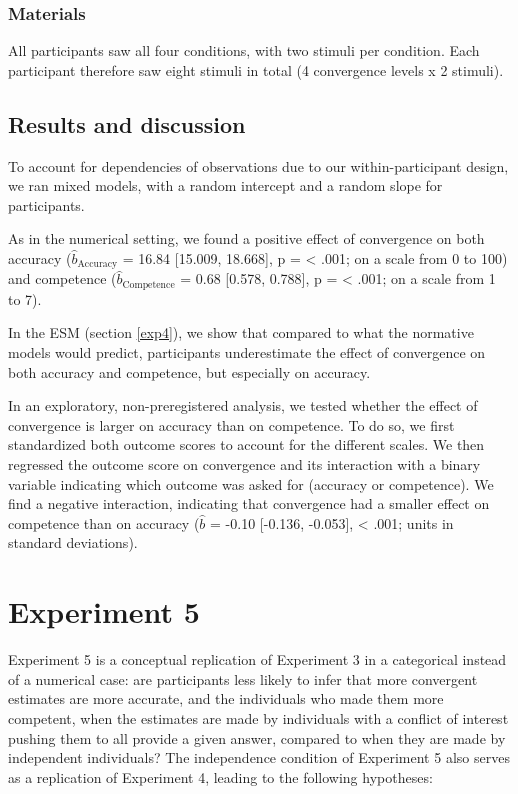 \documentclass[
  doc,floatsintext]{apa6}
\begin{document}
\subsubsection{Materials}\label{materials-3}

All participants saw all four conditions, with two stimuli per condition. Each participant therefore saw eight stimuli in total (4 convergence levels x 2 stimuli).

\subsection{Results and discussion}\label{results-and-discussion-3}

To account for dependencies of observations due to our within-participant design, we ran mixed models, with a random intercept and a random slope for participants.

As in the numerical setting, we found a positive effect of convergence on both accuracy (\(\hat{b}_{\text{Accuracy}}\) = 16.84 {[}15.009, 18.668{]}, p = \textless{} .001; on a scale from 0 to 100) and competence (\(\hat{b}_{\text{Competence}}\) = 0.68 {[}0.578, 0.788{]}, p = \textless{} .001; on a scale from 1 to 7).

In the ESM (section \ref{exp4}), we show that compared to what the normative models would predict, participants underestimate the effect of convergence on both accuracy and competence, but especially on accuracy.

In an exploratory, non-preregistered analysis, we tested whether the effect of convergence is larger on accuracy than on competence. To do so, we first standardized both outcome scores to account for the different scales. We then regressed the outcome score on convergence and its interaction with a binary variable indicating which outcome was asked for (accuracy or competence). We find a negative interaction, indicating that convergence had a smaller effect on competence than on accuracy (\(\hat{b}\) = -0.10 {[}-0.136, -0.053{]}, \textless{} .001; units in standard deviations).

\section{Experiment 5}\label{experiment-5}

Experiment 5 is a conceptual replication of Experiment 3 in a categorical instead of a numerical case: are participants less likely to infer that more convergent estimates are more accurate, and the individuals who made them more competent, when the estimates are made by individuals with a conflict of interest pushing them to all provide a given answer, compared to when they are made by independent individuals? The independence condition of Experiment 5 also serves as a replication of Experiment 4, leading to the following hypotheses:
\end{document}
